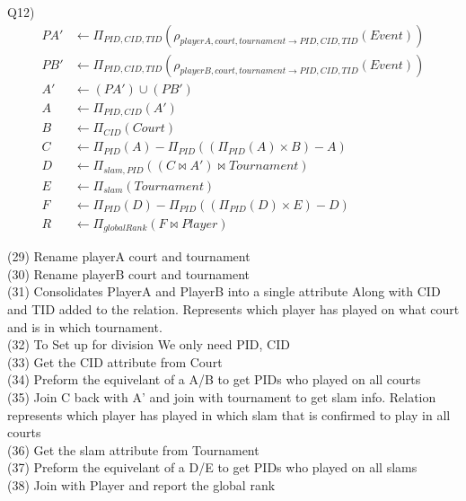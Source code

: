 \documentclass[12pt] {article}
\begin{document}
        Q12)
        \begin{align}
        	PA' &\leftarrow \Pi_{PID, CID, TID}(\rho_{playerA, court, tournament  \rightarrow PID, CID, TID }(Event))\\
        	PB' &\leftarrow \Pi_{PID, CID, TID}(\rho_{playerB, court, tournament  \rightarrow PID, CID, TID}(Event))\\
        	A' &\leftarrow  (PA')\cup(PB') \\
        	A &\leftarrow \Pi_{PID, CID}(A')\\
        	B &\leftarrow \Pi_{CID}(Court)\\
        	C &\leftarrow \Pi_{PID}(A) - \Pi_{PID}((\Pi_{PID}(A) \times B) - A)\\
        	D &\leftarrow \Pi_{slam, PID}((C \bowtie A') \bowtie Tournament)\\
        	E &\leftarrow \Pi_{slam}(Tournament)\\
        	F &\leftarrow \Pi_{PID}(D) - \Pi_{PID}((\Pi_{PID}(D) \times E) - D)\\
        	R &\leftarrow \Pi_{globalRank}(F \bowtie Player)
        \end{align}
        \begin{flushleft}
        (29) Rename playerA court and tournament\\
        (30) Rename playerB court and tournament\\
        (31) Consolidates PlayerA and PlayerB into a single attribute Along with CID and TID added to the relation. Represents which player has played on what court and is in which tournament. \\
        (32) To Set up for division We only need PID, CID \\
        (33) Get the CID attribute from Court\\
        (34) Preform the equivelant of a A/B to get PIDs who played on all courts\\
        (35) Join C back with A' and join with tournament to get slam info. Relation represents which player has played in which slam that is confirmed to play in all courts \\
        (36) Get the slam attribute from Tournament\\
        (37) Preform the equivelant of a D/E to get PIDs who played on all slams\\
        (38) Join with Player and report the global rank 
        \end{flushleft}
\end{document}

